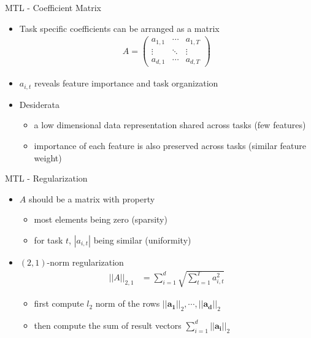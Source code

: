 \documentclass[first=dgreen,second=purple,logo=yellowexc]{aaltoslides}
\begin{document}
\begin{frame}{MTL - Coefficient Matrix }
\begin{itemize}
    \item Task specific coefficients can be arranged as a matrix
        \begin{align*}
            A=\left(
                \begin{array}{ccc}
                a_{1,1} & \cdots & a_{1,T} \\
                \vdots & \ddots & \vdots \\
                a_{d,1} & \cdots & a_{d,T}
                \end{array}
            \right)
        \end{align*}
    \item $a_{i,t}$ reveals feature importance and task organization 
    \item Desiderata
    \begin{itemize}
        \item a low dimensional data representation shared across tasks (few features)
        \item importance of each feature is also preserved across tasks (similar feature weight)
    \end{itemize}
\end{itemize}
\end{frame}


\begin{frame}{MTL - Regularization}
\begin{itemize}
    \item $A$ should be a matrix with property
    \begin{itemize}
        \item most elements being zero (sparsity)
        \item for task $t$, $|a_{i,t}|$ being similar (uniformity)
    \end{itemize}
    \item $(2,1)$-norm regularization
    \begin{align*}
        ||A||_{2,1} &= \sum_{i=1}^{d}\sqrt{\sum_{t=1}^{T}{a_{i,t}^2}}
    \end{align*}
    \begin{itemize}
        \item first compute $l_2$ norm of the rows $||\mathbf{a_{1}}||_2,\cdots,||\mathbf{a_{d}}||_2$
        \item then compute the sum of result vectors $\sum_{i=1}^{d}{||\mathbf{a_{i}}||_2}$
    \end{itemize}
\end{itemize}
\end{frame}
\end{document}

